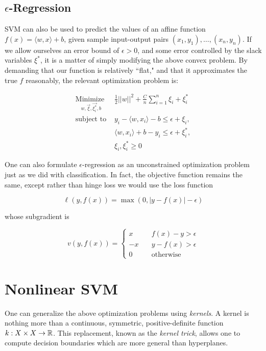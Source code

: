 \subsection{$\epsilon$-Regression}

SVM can also be used to predict the values of an affine function $f(x) = \langle
w, x\rangle+b$, given sample input-output pairs $(x_1,y_1),\ldots,(x_n,y_n)$. If
we allow ourselves an error bound of $\epsilon>0$, and some error controlled by
the slack variables $\xi^*$, it is a matter of simply modifying the above convex
problem. By demanding that our function is relatively ``flat," and that it
approximates the true $f$ reasonably, the relevant optimization problem is:

\begin{align*}
\underset{w,\vec{\xi},\vec{\xi^*_i},b}{\text{Minimize }} & \frac{1}{2}||w||^2 + \frac{C}{n}\sum_{i=1}^n \xi_i + \xi^*_i \\
\text{subject to } & y_i - \langle w, x_i\rangle - b \leq \epsilon + \xi_i,\\
						&  \langle w, x_i\rangle + b - y_i \leq \epsilon + \xi^*_i, \\
						& \xi_i,\xi^*_i \geq 0
\end{align*}

One can also formulate $\epsilon$-regression as an unconstrained optimization
problem just as we did with classification. In fact, the objective function
remains the same, except rather than hinge loss we would  use the loss function

\[ \ell(y,f(x)) = \max(0,|y-f(x)|-\epsilon) \]

whose subgradient is

$$
v(y,f(x)) = \left\{
        \begin{array}{ll}
            x & \quad f(x) - y > \epsilon \\
            -x  & \quad  y - f(x)  > \epsilon \\
            0 & \quad \text{otherwise}
        \end{array}
    \right.
$$

\section{Nonlinear SVM}\label{sec:nonlinear}

One can generalize the above optimization problems using \textit{kernels}. A
kernel is nothing more than a continuous, symmetric, positive-definite function
$k:X\times X \to \mathbb{R}$. This replacement, known as the \textit{kernel trick},
allows one to compute decision boundaries which are more general than
hyperplanes. \\



